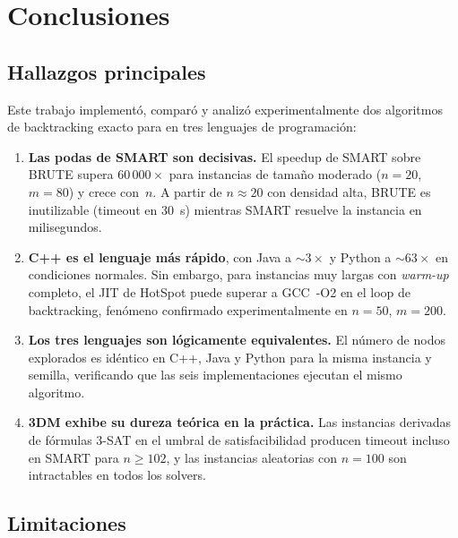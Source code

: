 \section{Conclusiones}
\label{sec:conclusiones}

\subsection{Hallazgos principales}
\label{sec:conc:hallazgos}

Este trabajo implementó, comparó y analizó experimentalmente dos algoritmos de
backtracking exacto para \threedm{} en tres lenguajes de programación:

\begin{enumerate}
  \item \textbf{Las podas de SMART son decisivas.}
        El speedup de SMART sobre BRUTE supera $60\,000\times$ para instancias
        de tamaño moderado ($n=20$, $m=80$) y crece con~$n$.
        A partir de $n\approx 20$ con densidad alta, BRUTE es inutilizable
        (timeout en 30~s) mientras SMART resuelve la instancia en milisegundos.

  \item \textbf{C++ es el lenguaje más rápido}, con Java a $\sim3\times$ y
        Python a $\sim63\times$ en condiciones normales.
        Sin embargo, para instancias muy largas con \textit{warm-up} completo,
        el JIT de HotSpot puede superar a GCC~-O2 en el loop de backtracking,
        fenómeno confirmado experimentalmente en $n=50$, $m=200$.

  \item \textbf{Los tres lenguajes son lógicamente equivalentes.}
        El número de nodos explorados es idéntico en C++, Java y Python para la
        misma instancia y semilla, verificando que las seis implementaciones
        ejecutan el mismo algoritmo.

  \item \textbf{3DM exhibe su dureza teórica en la práctica.}
        Las instancias derivadas de fórmulas 3-SAT en el umbral de
        satisfacibilidad producen timeout incluso en SMART para $n\ge 102$,
        y las instancias aleatorias con $n=100$ son intractables en todos los
        solvers.
\end{enumerate}

\subsection{Limitaciones}
\label{sec:conc:limitaciones}

